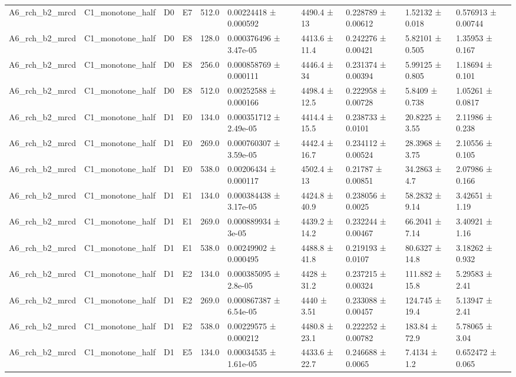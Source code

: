 \begin{table}
\begin{tabular}{llllllllll}
A6\_rch\_b2\_mrcd & C1\_monotone\_half & D0 & E7 & 512.0 & 0.00224418 ± 0.000592 & 4490.4 ± 13 & 0.228789 ± 0.00612 & 1.52132 ± 0.018 & 0.576913 ± 0.00744 \\
A6\_rch\_b2\_mrcd & C1\_monotone\_half & D0 & E8 & 128.0 & 0.000376496 ± 3.47e-05 & 4413.6 ± 11.4 & 0.242276 ± 0.00421 & 5.82101 ± 0.505 & 1.35953 ± 0.167 \\
A6\_rch\_b2\_mrcd & C1\_monotone\_half & D0 & E8 & 256.0 & 0.000858769 ± 0.000111 & 4446.4 ± 34 & 0.231374 ± 0.00394 & 5.99125 ± 0.805 & 1.18694 ± 0.101 \\
A6\_rch\_b2\_mrcd & C1\_monotone\_half & D0 & E8 & 512.0 & 0.00252588 ± 0.000166 & 4498.4 ± 12.5 & 0.222958 ± 0.00728 & 5.8409 ± 0.738 & 1.05261 ± 0.0817 \\
A6\_rch\_b2\_mrcd & C1\_monotone\_half & D1 & E0 & 134.0 & 0.000351712 ± 2.49e-05 & 4414.4 ± 15.5 & 0.238733 ± 0.0101 & 20.8225 ± 3.55 & 2.11986 ± 0.238 \\
A6\_rch\_b2\_mrcd & C1\_monotone\_half & D1 & E0 & 269.0 & 0.000760307 ± 3.59e-05 & 4442.4 ± 16.7 & 0.234112 ± 0.00524 & 28.3968 ± 3.75 & 2.10556 ± 0.105 \\
A6\_rch\_b2\_mrcd & C1\_monotone\_half & D1 & E0 & 538.0 & 0.00206434 ± 0.000117 & 4502.4 ± 13 & 0.21787 ± 0.00851 & 34.2863 ± 4.7 & 2.07986 ± 0.166 \\
A6\_rch\_b2\_mrcd & C1\_monotone\_half & D1 & E1 & 134.0 & 0.000384438 ± 3.17e-05 & 4424.8 ± 40.9 & 0.238056 ± 0.0025 & 58.2832 ± 9.14 & 3.42651 ± 1.19 \\
A6\_rch\_b2\_mrcd & C1\_monotone\_half & D1 & E1 & 269.0 & 0.000889934 ± 3e-05 & 4439.2 ± 14.2 & 0.232244 ± 0.00467 & 66.2041 ± 7.14 & 3.40921 ± 1.16 \\
A6\_rch\_b2\_mrcd & C1\_monotone\_half & D1 & E1 & 538.0 & 0.00249902 ± 0.000495 & 4488.8 ± 41.8 & 0.219193 ± 0.0107 & 80.6327 ± 14.8 & 3.18262 ± 0.932 \\
A6\_rch\_b2\_mrcd & C1\_monotone\_half & D1 & E2 & 134.0 & 0.000385095 ± 2.8e-05 & 4428 ± 31.2 & 0.237215 ± 0.00324 & 111.882 ± 15.8 & 5.29583 ± 2.41 \\
A6\_rch\_b2\_mrcd & C1\_monotone\_half & D1 & E2 & 269.0 & 0.000867387 ± 6.54e-05 & 4440 ± 3.51 & 0.233088 ± 0.00457 & 124.745 ± 19.4 & 5.13947 ± 2.41 \\
A6\_rch\_b2\_mrcd & C1\_monotone\_half & D1 & E2 & 538.0 & 0.00229575 ± 0.000212 & 4480.8 ± 23.1 & 0.222252 ± 0.00782 & 183.84 ± 72.9 & 5.78065 ± 3.04 \\
A6\_rch\_b2\_mrcd & C1\_monotone\_half & D1 & E5 & 134.0 & 0.00034535 ± 1.61e-05 & 4433.6 ± 22.7 & 0.246688 ± 0.0065 & 7.4134 ± 1.2 & 0.652472 ± 0.065 \\

\end{tabular}
\end{table}
